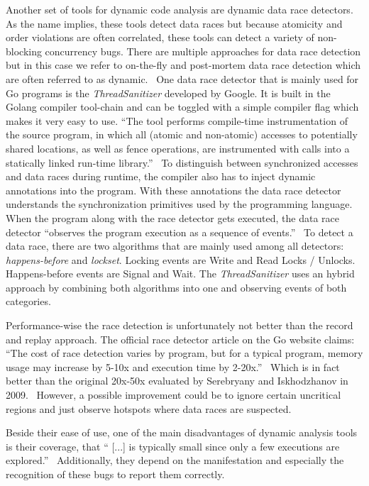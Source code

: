 \documentclass[conference]{IEEEtran}
\begin{document}
Another set of tools for dynamic code analysis are dynamic data race detectors.
As the name implies, these tools detect data races but because atomicity and order violations are often correlated, these tools can detect a variety of non-blocking concurrency bugs.
There are multiple approaches for data race detection but in this case we refer to on-the-fly and post-mortem data race detection which are often referred to as dynamic.~\cite{serebry2009threadsanitizer}
One data race detector that is mainly used for Go programs is the \emph{ThreadSanitizer} developed by Google.
It is built in the Golang compiler tool-chain and can be toggled with a simple compiler flag which makes it very easy to use.
``The tool performs compile-time instrumentation of the source program, in which all (atomic and non-atomic) accesses to potentially shared locations, as well as fence operations, are instrumented with calls into a statically linked run-time library.''~\cite{lidbury2019sparse}
To distinguish between synchronized accesses and data races during runtime, the compiler also has to inject dynamic annotations into the program.
With these annotations the data race detector understands the synchronization primitives used by the programming language.
When the program along with the race detector gets executed, the data race detector ``observes the program execution as a sequence of events.''~\cite{serebry2009threadsanitizer}
To detect a data race, there are two algorithms that are mainly used among all detectors: \emph{happens-before} and \emph{lockset}.
Locking events are Write and Read Locks / Unlocks.
Happens-before events are Signal and Wait.
The \emph{ThreadSanitizer} uses an hybrid approach by combining both algorithms into one and observing events of both categories.

Performance-wise the race detection is unfortunately not better than the record and replay approach.
The official race detector article on the Go website claims: ``The cost of race detection varies by program, but for a typical program, memory usage may increase by 5-10x and execution time by 2-20x.''~\cite{goRaceDetector}
Which is in fact better than the original 20x-50x evaluated by Serebryany and Iskhodzhanov in 2009.~\cite{serebry2009threadsanitizer}
However, a possible improvement could be to ignore certain uncritical regions and just observe hotspots where data races are suspected.


Beside their ease of use, one of the main disadvantages of dynamic analysis tools is their coverage, that `` [...] is typically small since only a few executions are explored.''~\cite{qadeer2004kiss}
Additionally, they depend on the manifestation and especially the recognition of these bugs to report them correctly.
\end{document}
